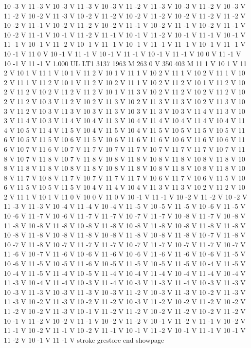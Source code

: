 {10 -3 V
11 -3 V
10 -3 V
11 -3 V
10 -3 V
11 -2 V
11 -3 V
10 -3 V
11 -2 V
10 -3 V
11 -2 V
10 -2 V
11 -3 V
10 -2 V
11 -2 V
10 -2 V
11 -2 V
10 -2 V
11 -2 V
11 -2 V
10 -2 V
11 -1 V
10 -2 V
11 -2 V
10 -2 V
11 -1 V
10 -2 V
11 -1 V
10 -2 V
11 -1 V
10 -2 V
11 -1 V
10 -1 V
11 -2 V
11 -1 V
10 -1 V
11 -2 V
10 -1 V
11 -1 V
10 -1 V
11 -1 V
10 -1 V
11 -2 V
10 -1 V
11 -1 V
10 -1 V
11 -1 V
11 -1 V
10 -1 V
11 -1 V
10 -1 V
11 0 V
10 -1 V
11 -1 V
10 -1 V
11 -1 V
10 -1 V
11 -1 V
10 0 V
11 -1 V
10 -1 V
11 -1 V
1.000 UL
LT1
3137 1963 M
263 0 V
350 403 M
11 1 V
10 1 V
11 2 V
10 1 V
11 1 V
10 1 V
11 2 V
10 1 V
11 1 V
10 2 V
11 1 V
10 2 V
11 1 V
10 2 V
11 1 V
11 2 V
10 1 V
11 2 V
10 2 V
11 1 V
10 2 V
11 2 V
10 1 V
11 2 V
10 2 V
11 2 V
10 2 V
11 2 V
11 2 V
10 1 V
11 3 V
10 2 V
11 2 V
10 2 V
11 2 V
10 2 V
11 2 V
10 3 V
11 2 V
10 2 V
11 3 V
10 2 V
11 3 V
11 3 V
10 2 V
11 3 V
10 3 V
11 2 V
10 3 V
11 3 V
10 3 V
11 3 V
10 3 V
11 3 V
10 3 V
11 4 V
11 3 V
10 3 V
11 4 V
10 3 V
11 4 V
10 4 V
11 3 V
10 4 V
11 4 V
10 4 V
11 4 V
10 4 V
11 4 V
10 5 V
11 4 V
11 5 V
10 4 V
11 5 V
10 4 V
11 5 V
10 5 V
11 5 V
10 5 V
11 6 V
10 5 V
11 5 V
10 6 V
11 5 V
10 6 V
11 6 V
11 6 V
10 6 V
11 6 V
10 6 V
11 6 V
10 7 V
11 6 V
10 7 V
11 7 V
10 7 V
11 7 V
10 7 V
11 7 V
11 7 V
10 7 V
11 8 V
10 7 V
11 8 V
10 7 V
11 8 V
10 8 V
11 8 V
10 8 V
11 8 V
10 8 V
11 8 V
10 8 V
11 8 V
11 8 V
10 8 V
11 8 V
10 8 V
11 8 V
10 8 V
11 8 V
10 8 V
11 8 V
10 8 V
11 7 V
10 8 V
11 7 V
10 7 V
11 7 V
11 7 V
10 6 V
11 7 V
10 6 V
11 5 V
10 6 V
11 5 V
10 5 V
11 5 V
10 4 V
11 4 V
10 4 V
11 3 V
11 3 V
10 2 V
11 2 V
10 2 V
11 1 V
10 1 V
11 0 V
10 0 V
11 0 V
10 -1 V
11 -1 V
10 -2 V
11 -2 V
10 -2 V
11 -3 V
11 -3 V
10 -4 V
11 -4 V
10 -4 V
11 -5 V
10 -5 V
11 -5 V
10 -6 V
11 -5 V
10 -6 V
11 -7 V
10 -6 V
11 -7 V
11 -7 V
10 -7 V
11 -7 V
10 -8 V
11 -7 V
10 -8 V
11 -8 V
10 -8 V
11 -8 V
10 -8 V
11 -8 V
10 -8 V
11 -8 V
10 -8 V
11 -8 V
11 -8 V
10 -8 V
11 -8 V
10 -8 V
11 -8 V
10 -8 V
11 -8 V
10 -8 V
11 -8 V
10 -7 V
11 -8 V
10 -7 V
11 -8 V
10 -7 V
11 -7 V
11 -7 V
10 -7 V
11 -7 V
10 -7 V
11 -7 V
10 -7 V
11 -6 V
10 -7 V
11 -6 V
10 -6 V
11 -6 V
10 -6 V
11 -6 V
11 -6 V
10 -6 V
11 -5 V
10 -6 V
11 -5 V
10 -5 V
11 -6 V
10 -5 V
11 -5 V
10 -5 V
11 -5 V
10 -4 V
11 -5 V
10 -4 V
11 -5 V
11 -4 V
10 -5 V
11 -4 V
10 -4 V
11 -4 V
10 -4 V
11 -4 V
10 -4 V
11 -3 V
10 -4 V
11 -4 V
10 -3 V
11 -4 V
10 -3 V
11 -3 V
11 -4 V
10 -3 V
11 -3 V
10 -3 V
11 -3 V
10 -3 V
11 -3 V
10 -3 V
11 -2 V
10 -3 V
11 -3 V
10 -2 V
11 -3 V
11 -3 V
10 -2 V
11 -3 V
10 -2 V
11 -2 V
10 -3 V
11 -2 V
10 -2 V
11 -2 V
10 -2 V
11 -2 V
10 -2 V
11 -3 V
10 -1 V
11 -2 V
11 -2 V
10 -2 V
11 -2 V
10 -2 V
11 -2 V
10 -1 V
11 -2 V
10 -2 V
11 -1 V
10 -2 V
11 -2 V
10 -1 V
11 -2 V
11 -1 V
10 -2 V
11 -1 V
10 -2 V
11 -1 V
10 -2 V
11 -1 V
10 -1 V
11 -2 V
10 -1 V
11 -1 V
10 -1 V
11 -2 V
10 -1 V
11 -1 V
stroke
grestore
end
showpage
}
